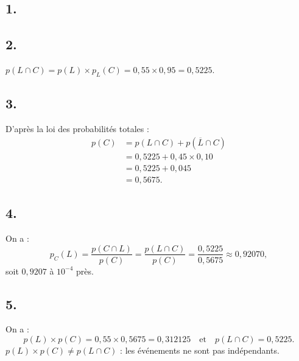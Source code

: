 \subsection*{1.}

\begin{center}
\end{center}

\subsection*{2.}

\(p(L \cap C) = p(L) \times p_L(C) = 0{,}55 \times 0{,}95 = 0{,}5225\).

\subsection*{3.}

D'après la loi des probabilités totales :
\begin{align*}
p(C) &= p(L \cap C) + p(\overline{L} \cap C) \\
&= 0{,}5225 + 0{,}45 \times 0{,}10 \\
&= 0{,}5225 + 0{,}045 \\
&= 0{,}5675.
\end{align*}

\subsection*{4.}

On a :
\[
p_C(L) = \dfrac{p(C \cap L)}{p(C)} = \dfrac{p(L \cap C)}{p(C)} = \dfrac{0{,}5225}{0{,}5675} \approx 0{,}92070,
\]
soit \(0{,}9207\) à \(10^{-4}\) près.

\subsection*{5.}

On a :
\[
p(L) \times p(C) = 0{,}55 \times 0{,}5675 = 0{,}312125 \quad \text{et} \quad p(L \cap C) = 0{,}5225.
\]
\( p(L) \times p(C) \neq p(L \cap C) \) : les événements ne sont pas indépendants.
